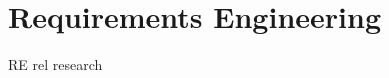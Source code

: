 \section{Requirements Engineering}
\label{chp:related_research:sec:requirements_engineering}
RE rel research
